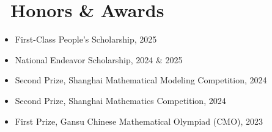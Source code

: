 \documentclass{resume}
\begin{document}
\section{\faTrophy\ Honors \& Awards}
\begin{itemize}[parsep=0.5ex]
    \item First-Class People's Scholarship, 2025
    \item National Endeavor Scholarship, 2024 \& 2025
    \item Second Prize, Shanghai Mathematical Modeling Competition, 2024
    \item Second Prize, Shanghai Mathematics Competition, 2024
    \item First Prize, Gansu Chinese Mathematical Olympiad (CMO), 2023
\end{itemize}
\end{document}
